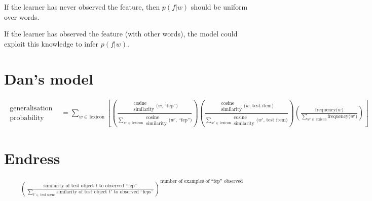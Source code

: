 \documentclass{tufte-book}
\begin{document}
If the learner has never observed the feature, then $p(f | w)$ should be uniform over words.

If the learner has observed the feature (with other words), the model could exploit this knowledge to infer $p(f | w)$.

\newpage

\begin{landscape}
\section{Dan's model}


\begin{align*}
    \begin{array}{c}\text{generalisation} \\ \text{probability}\end{array}
    &=\sum_{w \in\, \text{lexicon}}
    \left[
    \left(
    \frac{\begin{array}{c}\text{cosine} \\ \text{similarity}\end{array}\text{($w$, ``fep'')}}
    {\sum_{w' \in\, \text{lexicon}}\begin{array}{c}\text{cosine} \\ \text{similarity}\end{array}\text{($w'$, ``fep'')}}
    \right)
    \left(
    \frac{\begin{array}{c}\text{cosine} \\ \text{similarity}\end{array}\text{($w$, test item)}}
    {\sum_{w' \in\, \text{lexicon}}\begin{array}{c}\text{cosine} \\ \text{similarity}\end{array}\text{($w'$, test item)}}
    \right)
    \left(
    \frac{\text{frequency($w$)}}
    {\sum_{w' \in\, \text{lexicon}}\text{frequency($w'$)}}
    \right)
\right]
\end{align*}


\section{Endress}
\begin{align*}
    \left(\frac{\text{similarity of test object $t$ to observed ``fep''}}
    {\sum_{t' \in\, \text{test scene}}\text{similarity of test object $t'$ to observed ``feps''}}\right)^\text{number of examples of ``fep'' observed}
\end{align*}


\end{landscape}
\end{document}
